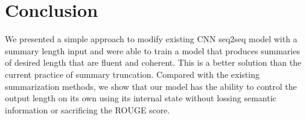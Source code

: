 \section{Conclusion}
\label{sec:conclude}
We presented a simple approach to modify existing CNN seq2seq model with
a summary length input and were able to train a model that produces 
summaries of desired length that are fluent and coherent. 
This is a better solution than the current practice of summary truncation. 
Compared with the existing
summarization methods, we show that our model has the ability to control the
output length on its own using its internal state without lossing semantic 
information or sacrificing the ROUGE score. 
